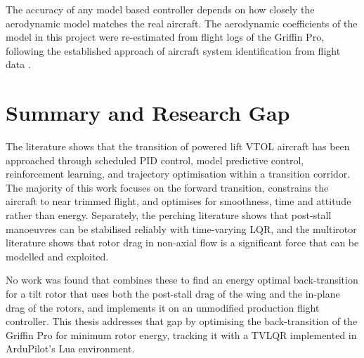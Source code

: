 The accuracy of any model based controller depends on how closely the aerodynamic model matches the real aircraft. The aerodynamic coefficients of the model in this project were re-estimated from flight logs of the Griffin Pro, following the established approach of aircraft system identification from flight data \cite{klein2006aircraft}.

\section{Summary and Research Gap}
\label{sec:lit_gap}

The literature shows that the transition of powered lift VTOL aircraft has been approached through scheduled PID control, model predictive control, reinforcement learning, and trajectory optimisation within a transition corridor. The majority of this work focuses on the forward transition, constrains the aircraft to near trimmed flight, and optimises for smoothness, time and attitude rather than energy. Separately, the perching literature shows that post-stall manoeuvres can be stabilised reliably with time-varying LQR, and the multirotor literature shows that rotor drag in non-axial flow is a significant force that can be modelled and exploited.

No work was found that combines these to find an energy optimal back-transition for a tilt rotor that uses both the post-stall drag of the wing and the in-plane drag of the rotors, and implements it on an unmodified production flight controller. This thesis addresses that gap by optimising the back-transition of the Griffin Pro for minimum rotor energy, tracking it with a TVLQR implemented in ArduPilot's Lua environment.